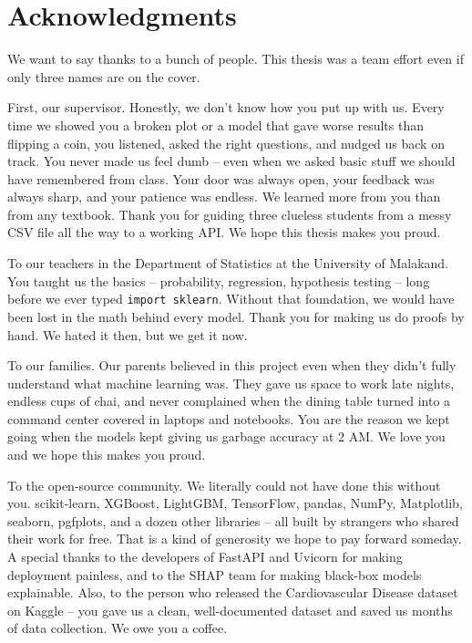 \documentclass[12pt, a4paper, oneside]{book}
\begin{document}
\clearpage
\thispagestyle{plain}
\chapter*{Acknowledgments}
We want to say thanks to a bunch of people. This thesis was a team effort even if only three names are on the cover.

First, our supervisor. Honestly, we don't know how you put up with us. Every time we showed you a broken plot or a model that gave worse results than flipping a coin, you listened, asked the right questions, and nudged us back on track. You never made us feel dumb – even when we asked basic stuff we should have remembered from class. Your door was always open, your feedback was always sharp, and your patience was endless. We learned more from you than from any textbook. Thank you for guiding three clueless students from a messy CSV file all the way to a working API. We hope this thesis makes you proud.

To our teachers in the Department of Statistics at the University of Malakand. You taught us the basics – probability, regression, hypothesis testing – long before we ever typed \texttt{import sklearn}. Without that foundation, we would have been lost in the math behind every model. Thank you for making us do proofs by hand. We hated it then, but we get it now.

To our families. Our parents believed in this project even when they didn't fully understand what machine learning was. They gave us space to work late nights, endless cups of chai, and never complained when the dining table turned into a command center covered in laptops and notebooks. You are the reason we kept going when the models kept giving us garbage accuracy at 2 AM. We love you and we hope this makes you proud.

To the open-source community. We literally could not have done this without you. scikit-learn, XGBoost, LightGBM, TensorFlow, pandas, NumPy, Matplotlib, seaborn, pgfplots, and a dozen other libraries – all built by strangers who shared their work for free. That is a kind of generosity we hope to pay forward someday. A special thanks to the developers of FastAPI and Uvicorn for making deployment painless, and to the SHAP team for making black-box models explainable. Also, to the person who released the Cardiovascular Disease dataset on Kaggle – you gave us a clean, well-documented dataset and saved us months of data collection. We owe you a coffee.
\end{document}
